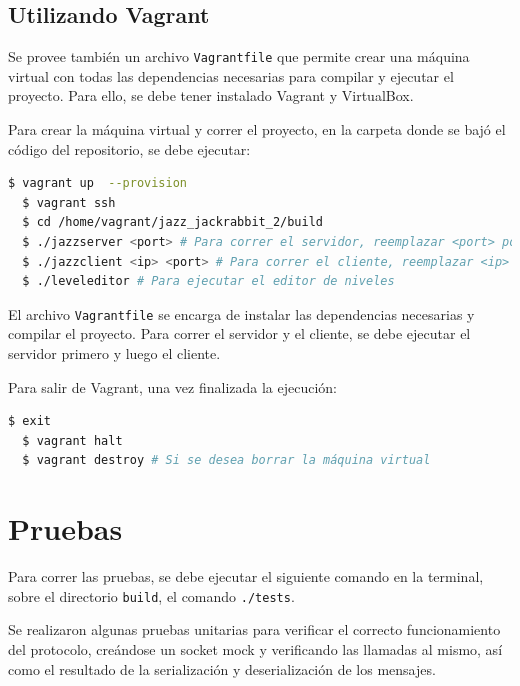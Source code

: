 \documentclass[titlepage,a4paper]{article}
\begin{document}
\subsection{Utilizando Vagrant}
Se provee también un archivo \texttt{Vagrantfile} que permite crear una máquina virtual con todas las dependencias necesarias para compilar y ejecutar el proyecto. Para ello, se debe tener instalado Vagrant y VirtualBox.

Para crear la máquina virtual y correr el proyecto, en la carpeta donde se bajó el código del repositorio, se debe ejecutar:

\begin{lstlisting}[language=sh,caption=Creación de la Máquina Virtual, captionpos=b]
  $ vagrant up  --provision
  $ vagrant ssh
  $ cd /home/vagrant/jazz_jackrabbit_2/build
  $ ./jazzserver <port> # Para correr el servidor, reemplazar <port> por un puerto a elección
  $ ./jazzclient <ip> <port> # Para correr el cliente, reemplazar <ip> por la IP del servidor (localhost) y <port> por el puerto
  $ ./leveleditor # Para ejecutar el editor de niveles
\end{lstlisting}

El archivo \texttt{Vagrantfile} se encarga de instalar las dependencias necesarias y compilar el proyecto. Para correr el servidor y el cliente, se debe ejecutar el servidor primero y luego el cliente.

Para salir de Vagrant, una vez finalizada la ejecución:

\begin{lstlisting}[language=sh,caption=Salir de Vagrant, captionpos=b]
  $ exit
  $ vagrant halt
  $ vagrant destroy # Si se desea borrar la máquina virtual
\end{lstlisting}

\section{Pruebas}
Para correr las pruebas, se debe ejecutar el siguiente comando en la terminal, sobre el directorio \texttt{build}, el comando \texttt{./tests}.

Se realizaron algunas pruebas unitarias para verificar el correcto funcionamiento del protocolo, creándose un socket mock y verificando las llamadas al mismo, así como el resultado de la serialización y deserialización de los mensajes.
\end{document}
